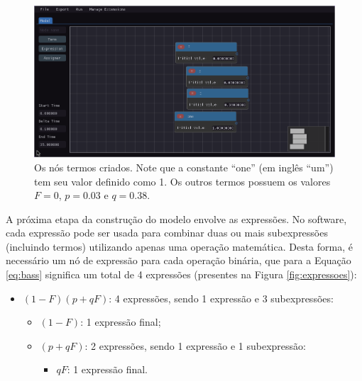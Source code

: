 \documentclass[
	12pt,				%
	openright,			%
	oneside,			%
	a4paper,			%
	main=brazil,
	english,			%
	]{ufsj-abntex2}
\begin{document}
\begin{figure}[h]
    \centering
    \includegraphics[width=\textwidth]{imgs/ode-designer/passo-a-passo/termos.png} 
    \caption{Os nós termos criados. Note que a constante ``one'' (em inglês ``um'') tem seu valor definido como 1. Os outros termos possuem os valores $F = 0$, $p = 0.03$ e $q = 0.38$.}
    \label{fig:termos}
\end{figure}

A próxima etapa da construção do modelo envolve as expressões. No software, cada expressão pode ser usada para combinar duas ou mais subexpressões (incluindo termos) utilizando apenas uma operação matemática. Desta forma, é necessário um nó de expressão para cada operação binária, que para a Equação \ref{eq:bass} significa um total de 4 expressões (presentes na Figura \ref{fig:expressoes}):

\begin{itemize}
    \item $(1 - F)(p + qF)$: 4 expressões, sendo 1 expressão e 3 subexpressões:
    \begin{itemize}
        \item $(1 - F)$: 1 expressão final;
        \item $(p + qF)$: 2 expressões, sendo 1 expressão e 1 subexpressão:
        \begin{itemize}
            \item $qF$: 1 expressão final.
        \end{itemize}
    \end{itemize}
\end{itemize}
\end{document}
